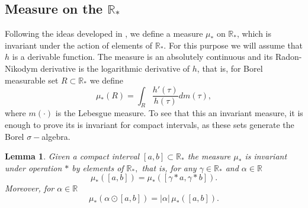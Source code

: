 \documentclass[10pt]{amsart}
\newtheorem{lemma}{Lemma}
\numberwithin{equation}{section}
\begin{document}
\subsection{Measure on the $\mathbb{R}_*$}

Following the ideas developed in \cite{JFP}, we define a measure $\mu_*$ on $\mathbb{R}_*$, which is invariant under the action of elements of $\mathbb{R}_*.$ For this purpose we will assume that $h$ is a derivable function. The measure is an absolutely continuous and  its Radon-Nikodym derivative is the logarithmic derivative of $h$, that is, for Borel measurable set $R \subset \mathbb{R}_*$ we define
\begin{equation*}
 \mu_*(R) = \int_R \frac{h'(\tau)}{h(\tau)} dm(\tau), 
\end{equation*}
where $m(\cdot)$ is the Lebesgue measure. To see that this an invariant measure, it is enough to prove its is invariant for compact intervals, as these sets generate the Borel $\sigma-$algebra.

\begin{lemma}
Given a compact interval $[a,b] \subset \mathbb{R}_*$ the measure $\mu_*$ is invariant under operation $*$  by elements of $\mathbb{R}_*,$ that is, for any $\gamma \in \mathbb{R}_*$ and $\alpha \in \mathbb{R}$ 
$$
\mu_*([a,b]) = \mu_*([\gamma*a,\gamma*b]).$$
Moreover, for $\alpha \in \mathbb{R}$
$$
 \mu_*(\alpha \odot [a, b]) = |\alpha| \, \mu_*([a, b]).
 $$
\end{lemma}
\end{document}
